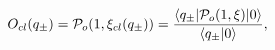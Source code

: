 \begin{equation}
O_{cl}(q_{\pm})={\cal P}_o(1,\xi_{cl}(q_{\pm}))=
\frac{\langle q_{\pm}|{\cal P}_o(1,\xi)|0 \rangle}{\langle q_{\pm}|0 
\rangle},
\end{equation}

